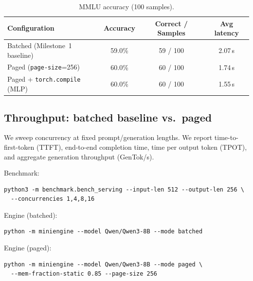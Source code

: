 \documentclass[11pt]{article}
\begin{document}
\begin{table}[htbp]
  \centering
  \caption{MMLU accuracy (100 samples).}
  \label{tab:mmlu}
  \begin{tabular}{@{}lccc@{}}
    \toprule
    Configuration & Accuracy & Correct / Samples & Avg latency \\
    \midrule
    Batched (Milestone~1 baseline) & 59.0\% & 59 / 100 & 2.07\,s \\
    Paged (\texttt{page-size}=256) & 60.0\% & 60 / 100 & 1.74\,s \\
    Paged + \texttt{torch.compile} (MLP) & 60.0\% & 60 / 100 & 1.55\,s \\
    \bottomrule
  \end{tabular}
\end{table}

\subsection{Throughput: batched baseline vs.\ paged}

\noindent We sweep concurrency at fixed prompt/generation lengths. We report time-to-first-token (TTFT), end-to-end completion time, time per output token (TPOT), and aggregate generation throughput (GenTok/s).

\noindent Benchmark:
\begin{verbatim}
python3 -m benchmark.bench_serving --input-len 512 --output-len 256 \
  --concurrencies 1,4,8,16
\end{verbatim}

\noindent Engine (batched):
\begin{verbatim}
python -m miniengine --model Qwen/Qwen3-8B --mode batched
\end{verbatim}

\noindent Engine (paged):
\begin{verbatim}
python -m miniengine --model Qwen/Qwen3-8B --mode paged \
  --mem-fraction-static 0.85 --page-size 256
\end{verbatim}
\end{document}
